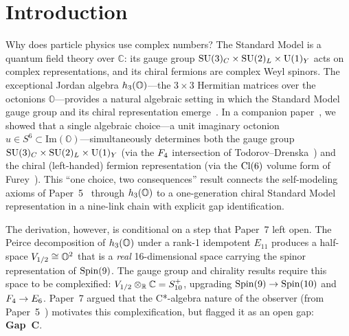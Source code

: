 
\section{Introduction}\label{sec:intro}

Why does particle physics use complex numbers?  The Standard Model is
a quantum field theory over $\mathbb{C}$: its gauge group $\mathrm{SU}(3)_C \times \mathrm{SU}(2)_L \times \mathrm{U}(1)_Y$
acts on complex representations, and its chiral fermions are
complex Weyl spinors.  The exceptional Jordan algebra
$h_3(\mathbb{O})$---the $3\times 3$ Hermitian matrices over the octonions
$\mathbb{O}$---provides a natural algebraic setting in which the
Standard Model gauge group and its chiral representation
emerge~\cite{JvNW1934,TodorovDrenska2018,Furey2018,Boyle2020,BGW2020}.
In a companion paper~\cite{Paper7}, we showed that a single algebraic
choice---a unit imaginary octonion $u \in S^6 \subset
\mathrm{Im}(\mathbb{O})$---simultaneously determines both the gauge
group $\mathrm{SU}(3)_C \times \mathrm{SU}(2)_L \times \mathrm{U}(1)_Y$ (via the $F_4$ intersection of
Todorov--Drenska~\cite{TodorovDrenska2018}) and the chiral
(left-handed) fermion representation (via the $\mathrm{Cl}(6)$ volume form of
Furey~\cite{Furey2018}).  This ``one choice, two consequences'' result
connects the self-modeling axioms of Paper~5~\cite{Paper5} through
$h_3(\mathbb{O})$ to a one-generation chiral Standard Model representation in
a nine-link chain with explicit gap identification.

The derivation, however, is conditional on a step that Paper~7 left
open.  The Peirce decomposition of $h_3(\mathbb{O})$ under a rank-1
idempotent $E_{11}$ produces a half-space $V_{1/2} \cong \mathbb{O}^2$
that is a \emph{real} 16-dimensional space carrying the spinor
representation of $\mathrm{Spin}(9)$.  The gauge group and chirality
results require this space to be complexified:
$V_{1/2} \otimes_{\mathbb{R}} \mathbb{C} = S_{10}^+$, upgrading
$\mathrm{Spin}(9) \to \mathrm{Spin}(10)$ and $F_4 \to E_6$.  Paper~7
argued that the C*-algebra nature of the observer (from
Paper~5~\cite{Paper5}) motivates this complexification, but flagged
it as an open gap: \textbf{Gap~C}.

